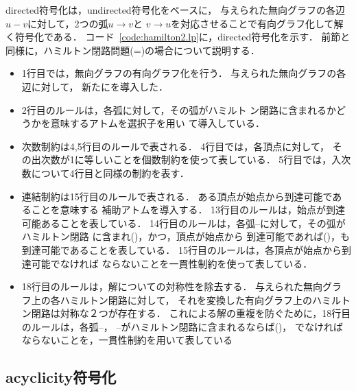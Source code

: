 \textsf{directed}符号化は，\textsf{undirected}符号化をベースに，
与えられた無向グラフの各辺$u-v$に対して，2つの弧$u\rightarrow v$と
$v\rightarrow u$を対応させることで有向グラフ化して解く符号化である．
コード~\ref{code:hamilton2.lp}に，\textsf{directed}符号化を示す．
前節と同様に，ハミルトン閉路問題(=)の場合について説明する．

\begin{itemize}
\item 1行目では，無向グラフの有向グラフ化を行う．
  与えられた無向グラフの各辺に対して，
  新たにを導入した．
\item 2行目のルールは，各弧に対して，その弧がハミルト
  ン閉路に含まれるかどうかを意味するアトムを選択子を用い
  て導入している．
\item 次数制約は4,5行目のルールで表される．
  4行目では，各頂点に対して，
  その出次数が1に等しいことを個数制約を使って表している．
  5行目では，入次数について4行目と同様の制約を表す．
\item 連結制約は15行目のルールで表される．
  ある頂点が始点から到達可能であることを意味する
  補助アトムを導入する．
  13行目のルールは，始点が到達可能あることを表している．
  14行目のルールは，各弧--に対して，その弧がハミルトン閉路
  に含まれ()，かつ，頂点が始点から
  到達可能であれば()，も到達可能であることを表している．
  15行目のルールは，各頂点が始点から到達可能でなければ
  ならないことを一貫性制約を使って表している．
\item 18行目のルールは，解についての対称性を除去する．
  与えられた無向グラフ上の各ハミルトン閉路に対して，
  それを変換した有向グラフ上のハミルトン閉路は対称な２つが存在する．
  これによる解の重複を防ぐために，18行目のルールは，各弧--，
  --がハミルトン閉路に含まれるならば()，
  でなければならないことを，一貫性制約を用いて表している
\end{itemize}

\subsection{\textsf{acyclicity}符号化}




